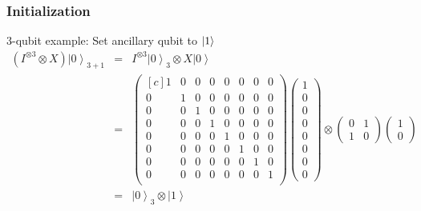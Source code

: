 \begin{frame}
\frametitle{Initialization}

\begin{exampleblock}{3-qubit example: Set ancillary qubit to $\ket{1}$}
\begin{eqnarray}
(I^{\otimes3}\otimes X)\left.|0\right\rangle _{3+1}&=&I^{\otimes3}\left.|0\right\rangle _{3}\otimes X\left.|0\right\rangle \nonumber\\
&=&\begin{pmatrix*}[c]
1&0&0&0&0&0&0&0\\
0&1&0&0&0&0&0&0\\
0&0&1&0&0&0&0&0\\
0&0&0&1&0&0&0&0\\
0&0&0&0&1&0&0&0\\
0&0&0&0&0&1&0&0\\
0&0&0&0&0&0&1&0\\
0&0&0&0&0&0&0&1\\
\end{pmatrix*}\left(\begin{array}{c}
1\\
0\\
0\\
0\\
0\\
0\\
0\\
0
\end{array}\right)\otimes\left(\begin{array}{cc}
0 & 1\\
1 & 0
\end{array}\right)\left(\begin{array}{c}
1\\
0
\end{array}\right)\nonumber\\
&=&\left.|0\right\rangle_3 \otimes\left.|1\right\rangle \nonumber
\end{eqnarray}
\end{exampleblock}


\end{frame}


